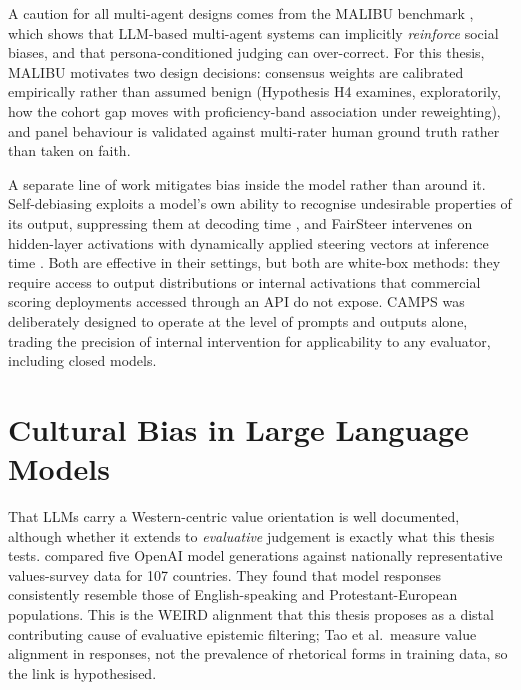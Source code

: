 A caution for all multi-agent designs comes from the MALIBU benchmark
\citep{mirza2025malibu}, which shows that LLM-based multi-agent systems
can implicitly \emph{reinforce} social biases, and that
persona-conditioned judging can over-correct. For this thesis, MALIBU
motivates two design decisions: consensus weights are calibrated
empirically rather than assumed benign (Hypothesis H4 examines,
exploratorily, how the cohort gap moves with proficiency-band
association under reweighting), and panel behaviour is validated
against multi-rater human ground truth rather than taken on faith.

A separate line of work mitigates bias inside the model rather than
around it. Self-debiasing exploits a model's own ability to recognise
undesirable properties of its output, suppressing them at decoding
time \citep{schick2021self}, and FairSteer intervenes on hidden-layer
activations with dynamically applied steering vectors at inference
time \citep{li2025fairsteer}. Both are effective in their settings,
but both are white-box methods: they require access to output
distributions or internal activations that commercial scoring
deployments accessed through an API do not expose. CAMPS was
deliberately designed to operate at the level of prompts and outputs
alone, trading the precision of internal intervention for
applicability to any evaluator, including closed models.

\section{Cultural Bias in Large Language Models}
\label{sec:lit-culture}

That LLMs carry a Western-centric value orientation is well
documented, although whether it extends to \emph{evaluative}
judgement is exactly what this thesis tests. \citet{tao2024cultural} compared five OpenAI model
generations against nationally representative values-survey data for
107 countries. They found that model responses consistently resemble
those of English-speaking and Protestant-European populations. This is
the WEIRD alignment that this thesis proposes as a distal
contributing cause of evaluative epistemic filtering; Tao et al.\
measure value alignment in responses, not the prevalence of
rhetorical forms in training data, so the link is hypothesised.

